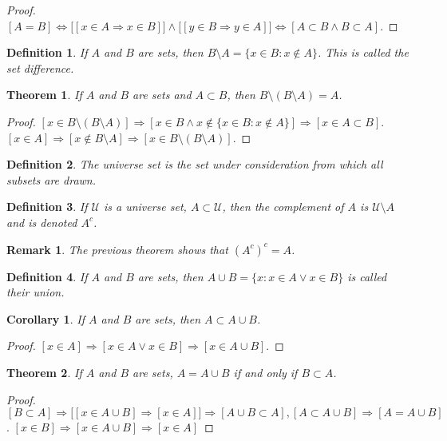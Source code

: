 \documentclass[crop=false,class=book]{standalone}
\theoremstyle{mystyle}
\newtheorem{theorem}{Theorem}[section]
\newtheorem{definition}{Definition}[section]
\newtheorem{corollary}{Corollary}[section]
\newtheorem{remark}{Remark}[section]
\begin{document}
\begin{proof}
$[A=B]\Leftrightarrow\big[[x\in A \Rightarrow x\in B]\big]\land \big[[y\in B \Rightarrow y\in A]\big]\Leftrightarrow [A\subset B\land B\subset A]$. 
\end{proof}
\begin{definition}
If $A$ and $B$ are sets, then $B\setminus A = \{x\in B:x\notin A\}$. This is called the set difference.
\end{definition}
\begin{theorem}
If $A$ and $B$ are sets and $A\subset B$, then $B\setminus(B\setminus A)=A$.
\end{theorem}
\begin{proof}
$[x\in B\setminus(B\setminus A)]\Rightarrow [x\in B \land x\notin \{x\in B:x\notin A\}]\Rightarrow [x\in A\subset B]$. $[x\in A]\Rightarrow [x\notin B\setminus A]\Rightarrow [x\in B\setminus(B\setminus A)]$.
\end{proof}
\begin{definition}
The universe set is the set under consideration from which all subsets are drawn.
\end{definition}
\begin{definition}
If $\mathcal{U}$ is a universe set, $A\subset \mathcal{U}$, then the complement of $A$ is $\mathcal{U}\setminus A$ and is denoted $A^c$.
\end{definition}
\begin{remark}
The previous theorem shows that $(A^c)^c = A$.
\end{remark}
\begin{definition}
If $A$ and $B$ are sets, then $A\cup B = \{x: x\in A \lor x\in B\}$ is called their union.
\end{definition}
\begin{corollary}
If $A$ and $B$ are sets, then $A\subset A\cup B$.
\end{corollary}
\begin{proof}
$[x\in A]\Rightarrow [x\in A\lor x\in B]\Rightarrow [x\in A\cup B]$.
\end{proof}
\begin{theorem}
If $A$ and $B$ are sets, $A=A\cup B$ if and only if $B\subset A$.
\end{theorem}
\begin{proof}
$[B\subset A]\Rightarrow \big[[x\in A\cup B] \Rightarrow [x\in A]\big]\Rightarrow[A\cup B \subset A], [A\subset A\cup B]\Rightarrow[A=A\cup B]$. $[x\in B] \Rightarrow [x\in A\cup B]\Rightarrow [x\in A]$
\end{proof}
\end{document}
